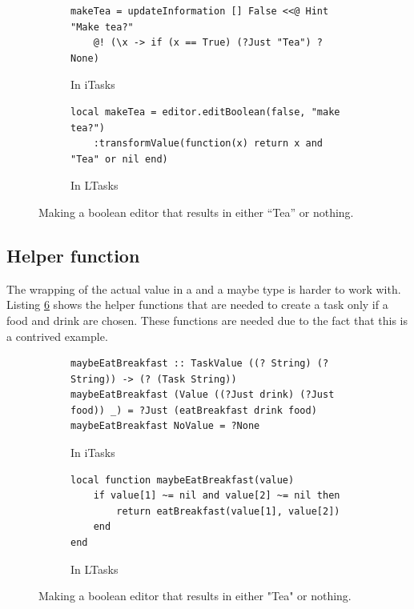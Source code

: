 \begin{figure}[ht]
\begin{subfigure}{\textwidth}
\centering
\begin{verbatim}
makeTea = updateInformation [] False <<@ Hint "Make tea?"
    @! (\x -> if (x == True) (?Just "Tea") ?None)
\end{verbatim}
\caption{In iTasks}
\label{lst:comparison_editors_clean}
\end{subfigure}
\begin{subfigure}{\textwidth}
\centering
\bigskip %
\begin{verbatim}
local makeTea = editor.editBoolean(false, "make tea?")
    :transformValue(function(x) return x and "Tea" or nil end)
\end{verbatim}
\caption{In LTasks}
\label{lst:comparison_editors_lua}
\end{subfigure}
\caption{Making a boolean editor that results in either ``Tea'' or nothing.}
\label{lst:comparison_editors}
\end{figure}

\subsection{Helper function}
The wrapping of the actual value in a  and a maybe type is harder to work with. Listing \ref{lst:comparison_maybe} shows the helper functions that are needed to create a  task only if a food and drink are chosen. These functions are needed due to the fact that this is a contrived example.

\begin{figure}[ht]
\begin{subfigure}{\textwidth}
\centering
\begin{verbatim}
maybeEatBreakfast :: TaskValue ((? String) (? String)) -> (? (Task String))
maybeEatBreakfast (Value ((?Just drink) (?Just food)) _) = ?Just (eatBreakfast drink food)
maybeEatBreakfast NoValue = ?None
\end{verbatim}
\caption{In iTasks}
\label{lst:comparison_maybe_clean}
\end{subfigure}
\begin{subfigure}{\textwidth}
\centering
\bigskip %
\begin{verbatim}
local function maybeEatBreakfast(value)
    if value[1] ~= nil and value[2] ~= nil then
        return eatBreakfast(value[1], value[2])
    end
end
\end{verbatim}
\caption{In LTasks}
\label{lst:comparison_maybe_lua}
\end{subfigure}
\caption{Making a boolean editor that results in either "Tea" or nothing.}
\label{lst:comparison_maybe}
\end{figure}

